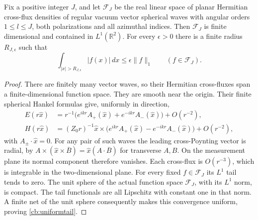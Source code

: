 \begin{lemma}
\label{cb:finitetail}
Fix a positive integer $J$, and let $\mathcal F_J$ be the real linear space
of planar Hermitian cross-flux densities of regular vacuum vector spherical
waves with angular orders $1\leq l\leq J$, both polarizations and all
azimuthal indices. Then $\mathcal F_J$ is finite dimensional and contained
in $L^1(\mathbb R^2)$. For every $\epsilon>0$ there is a finite radius
$R_{J,\epsilon}$ such that
\begin{equation}
 \int_{|x|>R_{J,\epsilon}}|f(x)|\,dx
       \leq\epsilon\|f\|_1\qquad(f\in\mathcal F_J).
 \label{cb:uniformtail}
\end{equation}
\end{lemma}
\begin{proof}
There are finitely many vector waves, so their Hermitian cross-fluxes span
a finite-dimensional function space. They are smooth near the origin.
Their finite spherical Hankel formulas give, uniformly in direction,
\begin{equation}
 \begin{split}
 E(r\widehat x)&=r^{-1}\bigl(e^{ikr}A_+(\widehat x)
                         +e^{-ikr}A_-(\widehat x)\bigr)+O(r^{-2}),\\
 H(r\widehat x)&=(Z_0r)^{-1}\widehat x\times
                 \bigl(e^{ikr}A_+(\widehat x)
                         -e^{-ikr}A_-(\widehat x)\bigr)+O(r^{-2}),
 \end{split}
 \label{cb:regularasymptotic}
\end{equation}
with $A_\pm\cdot\widehat x=0$. For any pair of such waves the leading
cross-Poynting vector is radial, by
$A\times(\widehat x\times\overline B)
=\widehat x(A\cdot\overline B)$ for transverse $A,B$.
On the measurement plane its normal component therefore vanishes.
Each cross-flux is $O(r^{-3})$, which is integrable in the two-dimensional
plane. For every fixed $f\in\mathcal F_J$ its $L^1$ tail tends to zero.
The unit sphere of the actual function space $\mathcal F_J$, with its
$L^1$ norm, is compact. The tail functionals are all Lipschitz with
constant one in that norm. A finite net of the unit sphere consequently
makes this convergence uniform, proving \eqref{cb:uniformtail}.
\end{proof}

